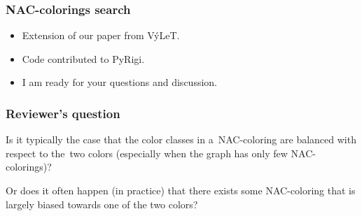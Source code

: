 \documentclass[aspectratio=\myaspectratio]{beamer}
\begin{document}
\begin{frame}
	\frametitle{NAC-colorings search}
	\begin{itemize}
		\item
		      Extension of our paper from VýLeT.
		\item
		      Code contributed to PyRigi.
		\item
		      I am ready for your questions and discussion.
	\end{itemize}
\end{frame}

\begin{frame}
	\frametitle{Reviewer's question}
	Is it typically the case that the color classes in a NAC-coloring are balanced with respect to the two colors (especially when the graph has only few NAC-colorings)?

	Or does it often happen (in practice) that there exists some NAC-coloring that is largely biased towards one of the two colors?
\end{frame}
\end{document}
